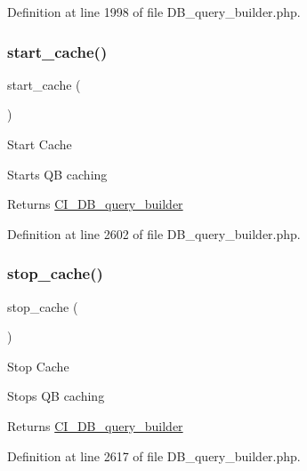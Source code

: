 Definition at line 1998 of file D\+B\+\_\+query\+\_\+builder.\+php.

\mbox{\label{class_c_i___d_b__query__builder_a2d4f0c7b71f87dc7ca7f7fcfbdd12ba0}} 
\subsubsection{\texorpdfstring{start\_cache()}{start\_cache()}}
{\footnotesize\ttfamily start\+\_\+cache (\begin{DoxyParamCaption}{ }\end{DoxyParamCaption})}

Start Cache

Starts QB caching

\begin{DoxyReturn}{Returns}
\mbox{\hyperlink{class_c_i___d_b__query__builder}{C\+I\+\_\+\+D\+B\+\_\+query\+\_\+builder}} 
\end{DoxyReturn}


Definition at line 2602 of file D\+B\+\_\+query\+\_\+builder.\+php.

\mbox{\label{class_c_i___d_b__query__builder_a612e54a6230b7e899c4d2a42a234bd5a}} 
\subsubsection{\texorpdfstring{stop\_cache()}{stop\_cache()}}
{\footnotesize\ttfamily stop\+\_\+cache (\begin{DoxyParamCaption}{ }\end{DoxyParamCaption})}

Stop Cache

Stops QB caching

\begin{DoxyReturn}{Returns}
\mbox{\hyperlink{class_c_i___d_b__query__builder}{C\+I\+\_\+\+D\+B\+\_\+query\+\_\+builder}} 
\end{DoxyReturn}


Definition at line 2617 of file D\+B\+\_\+query\+\_\+builder.\+php.

